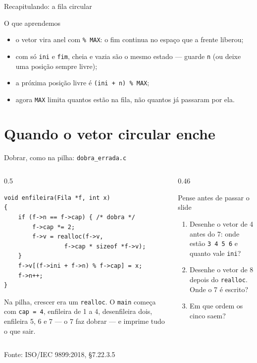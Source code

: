 \documentclass[aspectratio=169]{beamer}
\newcommand{\fonte}[1]{\vfill\hfill{\scriptsize\textcolor{UFSGray}{Fonte: #1}}}
\begin{document}
\begin{frame}{Recapitulando: a fila circular}
  \begin{block}{O que aprendemos}
    \begin{itemize}
      \item o vetor vira anel com \texttt{\% MAX}: o fim continua no espaço
        que a frente liberou;
      \item com só \texttt{ini} e \texttt{fim}, cheia e vazia são o mesmo
        estado --- guarde \texttt{n} (ou deixe uma posição sempre livre);
      \item a próxima posição livre é \texttt{(ini + n) \% MAX};
      \item agora \texttt{MAX} limita quantos estão na fila, não quantos já
        passaram por ela.
    \end{itemize}
  \end{block}
\end{frame}

\section{Quando o vetor circular enche}

\begin{frame}[fragile]{Dobrar, como na pilha: \texttt{dobra\_errada.c}}
  \begin{columns}[T]
    \begin{column}{0.5\textwidth}
\begin{lstlisting}[style=codC]
void enfileira(Fila *f, int x)
{
    if (f->n == f->cap) { /* dobra */
        f->cap *= 2;
        f->v = realloc(f->v,
                 f->cap * sizeof *f->v);
    }
    f->v[(f->ini + f->n) % f->cap] = x;
    f->n++;
}
\end{lstlisting}
      \small Na pilha, crescer era um \texttt{realloc}. O \texttt{main}
      começa com \texttt{cap = 4}, enfileira de 1 a 4, desenfileira dois,
      enfileira 5, 6 e 7 --- o 7 faz dobrar --- e imprime tudo o que sair.
    \end{column}
    \begin{column}{0.46\textwidth}
      \begin{block}{Pense antes de passar o slide}
        \small
        \begin{enumerate}
          \item Desenhe o vetor de 4 antes do 7: onde estão \texttt{3 4 5 6}
            e quanto vale \texttt{ini}?
          \item Desenhe o vetor de 8 depois do \texttt{realloc}. Onde o 7
            é escrito?
          \item Em que ordem os cinco saem?
        \end{enumerate}
      \end{block}
    \end{column}
  \end{columns}
  \fonte{ISO/IEC 9899:2018, §7.22.3.5~\cite{iso2018c17}}
\end{frame}
\end{document}

